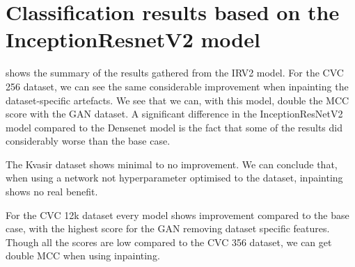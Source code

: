 \section{Classification results based on the InceptionResnetV2 model}
 shows the summary of the results gathered from the IRV2 model.
For the CVC 256 dataset, we can see the same considerable improvement when inpainting the dataset-specific artefacts. We see that we can, with this model, double the MCC score with the GAN dataset.
A significant difference in the InceptionResNetV2 model compared to the Densenet model is the fact that some of the results did considerably worse than the base case. 


The Kvasir dataset shows minimal to no improvement. We can conclude that, when using a network not hyperparameter optimised to the dataset, inpainting shows no real benefit.


For the CVC 12k dataset every model shows improvement compared to the base case, with the highest score for the GAN removing dataset specific features. Though all the scores are low compared to the CVC 356 dataset, we can get double MCC when using inpainting.


